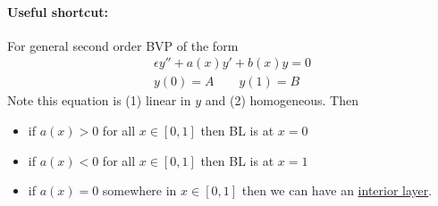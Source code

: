 \paragraph{Useful shortcut:} For general second order BVP of the form
\begin{gather*}
	\epsilon y'' + a(x) y' + b(x) y = 0 \\
	y(0) = A \qquad y(1) = B
\end{gather*}
Note this equation is (1) linear in $y$ and (2) homogeneous. Then
\begin{itemize}
	\item if $a(x)>0$ for all $x \in [0,1]$ then BL is at $x=0$
	\item if $a(x)<0$ for all $x \in [0,1]$ then BL is at $x=1$
	\item if $a(x)=0$ somewhere in $x \in [0,1]$ then we can have an \underline{interior layer}.
\end{itemize}



